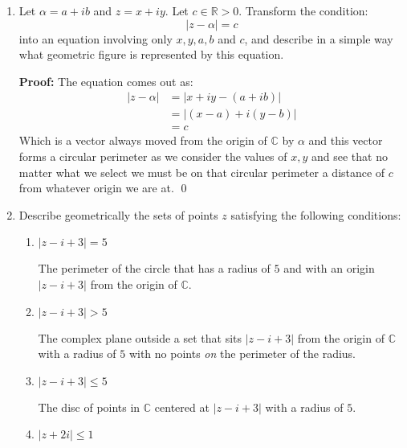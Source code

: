 \begin{enumerate}
\begin{enumerate}
		\item $|z| - |w| \leq |z - w|$
		
		\textbf{Proof:}
		By (a) above we just subtract $|w|$ off the right and left, and have a logically equivalent statement.
		\qed


		\item $|z| - |w| \leq |z + w|$
		
		\textbf{Proof:}
		If the above were not true, then (b) would be false, but (b) is true, so then: 
		\[|z| -|w| \leq |z + w| \]
		\qed
	\end{enumerate}
	
	\item Let $\alpha = a +ib$ and $z = x +iy.$ Let $c \in \mathbb{R} > 0.$ Transform the condition:
	$$|z - \alpha| = c$$
	into an equation involving only $x, y, a, b$ and $c$, and describe in a simple way what geometric figure is represented by this equation.

	\textbf{Proof:}
	The equation comes out as:
	\begin{align*}
		|z - \alpha| &= | x + iy - (a + ib) | \\
		&= | (x - a) + i(y - b) | \\
		&= c
	\end{align*}
	Which is a vector always moved from the origin of $\mathbb{C}$ by $\alpha$ and this vector forms a circular perimeter as we consider the values 
	of $x, y$ and see that no matter what we select we must be on that circular perimeter a distance of $c$ from whatever origin we are at.
	\qed
	
	\item Describe geometrically the sets of points $z$ satisfying the following conditions:
	\begin{enumerate}
		\item $|z - i + 3| = 5$

		The perimeter of the circle that has a radius of $5$ and with an origin $|z - i + 3|$ from the origin of $\mathbb{C}.$
		\item $|z - i + 3| > 5$

		The complex plane outside a set that sits $|z -i + 3|$ from the origin of $\mathbb{C}$ with a radius of $5$ with 
		no points \textit{on} the perimeter of the radius.

		\item $|z - i + 3| \leq 5$

		The disc of points in $\mathbb{C}$ centered at $|z - i + 3|$ with a radius of $5.$

		\item $|z + 2i| \leq 1$


\end{enumerate}
\end{enumerate}
